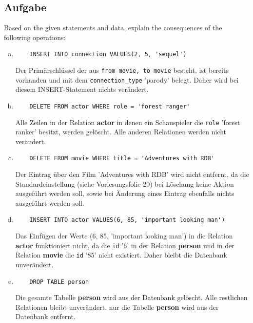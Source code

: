 \documentclass[11pt,a4paper,DIV=9]{scrartcl}
\newcounter{temp}
\newcommand{\aufgabe}[1]{
  \setcounter{temp}{\value{subsection}}
  \setcounter{subsection}{#1}
  \addtocounter{subsection}{-1}
  \subsection{Aufgabe}
  \setcounter{subsection}{\value{temp}}
}
\begin{document}
\aufgabe{2}
   Based on the given statements and data, explain the consequences of the following operations:
   \begin{enumerate}[a)]
   \item \begin{lstlisting} 
	INSERT INTO connection VALUES(2, 5, 'sequel') 
   \end{lstlisting} 
   Der Prim\"arschl\"ussel der aus \texttt{from\_movie, to\_movie} besteht, ist bereits vorhanden und mit dem \texttt{connection\_type} 'parody' belegt. Daher wird bei diesem INSERT-Statement nichts ver\"andert.
   
   
   \item \begin{lstlisting} 
	DELETE FROM actor WHERE role = 'forest ranger'
      \end{lstlisting}
      Alle Zeilen in der Relation \textbf{actor} in denen ein Schauspieler die \texttt{role} 'forest ranker' besitzt, werden gel\"oscht. Alle anderen Relationen werden nicht ver\"andert.
   
   

   \item \begin{lstlisting} 
	DELETE FROM movie WHERE title = 'Adventures with RDB'
   \end{lstlisting}
   Der Eintrag \"uber den Film 'Adventures with RDB' wird nicht entfernt, da die Standardeinstellung (siehe Vorlesungsfolie 20) bei L\"oschung keine Aktion ausgef\"uhrt werden soll, sowie bei \"Anderung eines Eintrag ebenfalls nichts ausgef\"uhrt werden soll.
   
   

   \item \begin{lstlisting} 
	INSERT INTO actor VALUES(6, 85, 'important looking man')
   \end{lstlisting}
   Das Einf\"ugen der Werte (6, 85, 'important looking man') in die Relation \textbf{actor} funktioniert nicht, da die \texttt{id} '6' in der Relation \textbf{person} und in der Relation \textbf{movie} die \texttt{id} '85' nicht existiert. Daher bleibt die Datenbank unver\"andert.
   
   

   \item \begin{lstlisting} 
	DROP TABLE person
  \end{lstlisting}
  Die gesamte Tabelle \textbf{person} wird aus der Datenbank gel\"oscht. Alle restlichen Relationen bleibt unver\"andert, nur die Tabelle \textbf{person} wird aus der Datenbank entfernt. 
 

 \end{enumerate}   
\end{document}
